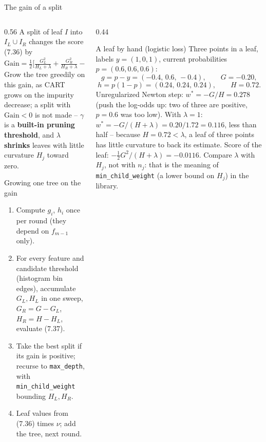 \documentclass[10pt,aspectratio=169]{beamer}
\begin{document}
\begin{frame}{The gain of a split}
\begin{columns}[T]
\begin{column}{0.56\textwidth}
\footnotesize
A split of leaf $I$ into $I_L\cup I_R$ changes the score (7.36) by
\[
\mathrm{Gain}=\tfrac12\Big[\tfrac{G_L^2}{H_L+\lambda}+\tfrac{G_R^2}{H_R+\lambda}
-\tfrac{(G_L+G_R)^2}{H_L+H_R+\lambda}\Big]-\gamma .\tag{7.37}
\]
Grow the tree greedily on this gain, as CART grows on the impurity
decrease; a split with $\mathrm{Gain}<0$ is not made -- $\gamma$ is a
\textbf{built-in pruning threshold}, and $\lambda$ \textbf{shrinks} leaves
with little curvature $H_j$ toward zero.
\begin{block}{Growing one tree on the gain}
\begin{enumerate}
  \item Compute $g_i$, $h_i$ once per round (they depend on $f_{m-1}$ only).
  \item For every feature and candidate threshold (histogram bin edges),
    accumulate $G_L,H_L$ in one sweep, $G_R=G-G_L$, $H_R=H-H_L$, evaluate
    (7.37).
  \item Take the best split if its gain is positive; recurse to
    \texttt{max\_depth}, with \texttt{min\_child\_weight} bounding $H_L,H_R$.
  \item Leaf values from (7.36) times $\nu$; add the tree, next round.
\end{enumerate}
\end{block}

\end{column}
\begin{column}{0.44\textwidth}
\begin{block}{A leaf by hand (logistic loss)}
\footnotesize
Three points in a leaf, labels $y=(1,0,1)$, current probabilities
$p=(0.6,0.6,0.6)$:
\[
g=p-y=(-0.4,\,0.6,\,-0.4),\qquad G=-0.20,
\]
\[
h=p(1-p)=(0.24,\,0.24,\,0.24),\qquad H=0.72 .
\]
Unregularized Newton step: $w^*=-G/H=0.278$ (push the log-odds up: two
of three are positive, $p=0.6$ was too low).  With $\lambda=1$:
$w^*=-G/(H+\lambda)=0.20/1.72=\mathbf{0.116}$, less than half -- because
$H=0.72<\lambda$, a leaf of three points has little curvature to back its
estimate.  Score of the leaf: $-\frac12G^2/(H+\lambda)=-0.0116$.  Compare
$\lambda$ with $H_j$, not with $n_j$: that is the meaning of
\texttt{min\_child\_weight} (a lower bound on $H_j$) in the library.
\end{block}

\end{column}
\end{columns}
\end{frame}
\end{document}
